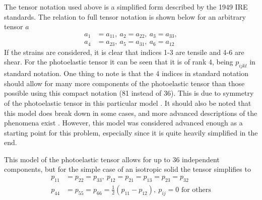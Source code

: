 \documentclass[11pt,twoside]{eitExjobb}
\begin{document}
	The tensor notation used above is a simplified form described by the 1949 IRE standards. The relation to full tensor notation is shown below for an arbitrary tensor $a$ \cite{Korpel1988}
	\begin{equation*}
	\begin{split}
		a_1 &= a_{11},\ a_2 = a_{22},\ a_3 = a_{33}, \\
		a_4 &= a_{23},\ a_5 = a_{31},\ a_6 = a_{12}
	\end{split}
	\end{equation*}
	If the strains are considered, it is clear that indices 1-3 are tensile and 4-6 are shear. For the photoelastic tensor it can be seen that it is of rank 4, being $p_{ijkl}$ in standard notation. One thing to note is that the 4 indices in standard notation should allow for many more components of the photoelastic tensor than those possible using this compact notation (81 instead of 36). This is due to symmetry of the photoelastic tensor in this particular model \cite{Saleh2007}. It should also be noted that this model does break down in some cases, and more advanced descriptions of the phenomena exist \cite{Nelson1971}. However, this model was considered advanced enough as a starting point for this problem, especially since it is quite heavily simplified in the end.
	
	This model of the photoelastic tensor allows for up to 36 independent components, but for the simple case of an isotropic solid the tensor simplifies to \cite{Korpel1988}
	\begin{equation*}
	\begin{split}
		p_{11} &= p_{22} = p_{33}, \ p_{12} = p_{21} = p_{13} = p_{23} = p_{32}\\
		p_{44} &= p_{55} = p_{66} = \frac{1}{2} (p_{11} - p_{12}), \ p_{ij} = 0 \text{ for others}
	\end{split}
	\end{equation*}
	
\end{document}
